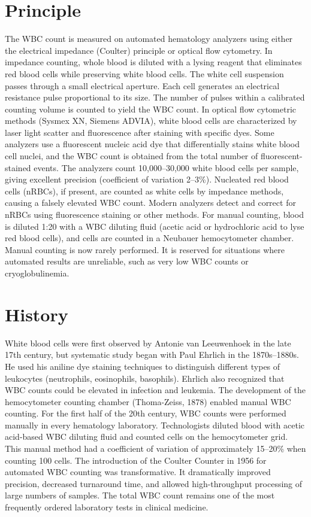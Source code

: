 \section*{Principle}
The WBC count is measured on automated hematology analyzers using either the electrical impedance (Coulter) principle or optical flow cytometry. In impedance counting, whole blood is diluted with a lysing reagent that eliminates red blood cells while preserving white blood cells. The white cell suspension passes through a small electrical aperture. Each cell generates an electrical resistance pulse proportional to its size. The number of pulses within a calibrated counting volume is counted to yield the WBC count. In optical flow cytometric methods (Sysmex XN, Siemens ADVIA), white blood cells are characterized by laser light scatter and fluorescence after staining with specific dyes. Some analyzers use a fluorescent nucleic acid dye that differentially stains white blood cell nuclei, and the WBC count is obtained from the total number of fluorescent-stained events. The analyzers count 10,000--30,000 white blood cells per sample, giving excellent precision (coefficient of variation 2--3\%). Nucleated red blood cells (nRBCs), if present, are counted as white cells by impedance methods, causing a falsely elevated WBC count. Modern analyzers detect and correct for nRBCs using fluorescence staining or other methods. For manual counting, blood is diluted 1:20 with a WBC diluting fluid (acetic acid or hydrochloric acid to lyse red blood cells), and cells are counted in a Neubauer hemocytometer chamber. Manual counting is now rarely performed. It is reserved for situations where automated results are unreliable, such as very low WBC counts or cryoglobulinemia.

\section*{History}
White blood cells were first observed by Antonie van Leeuwenhoek in the late 17th century, but systematic study began with Paul Ehrlich in the 1870s--1880s. He used his aniline dye staining techniques to distinguish different types of leukocytes (neutrophils, eosinophils, basophils). Ehrlich also recognized that WBC counts could be elevated in infection and leukemia. The development of the hemocytometer counting chamber (Thoma-Zeiss, 1878) enabled manual WBC counting. For the first half of the 20th century, WBC counts were performed manually in every hematology laboratory. Technologists diluted blood with acetic acid-based WBC diluting fluid and counted cells on the hemocytometer grid. This manual method had a coefficient of variation of approximately 15--20\% when counting 100 cells. The introduction of the Coulter Counter in 1956 for automated WBC counting was transformative. It dramatically improved precision, decreased turnaround time, and allowed high-throughput processing of large numbers of samples. The total WBC count remains one of the most frequently ordered laboratory tests in clinical medicine.

